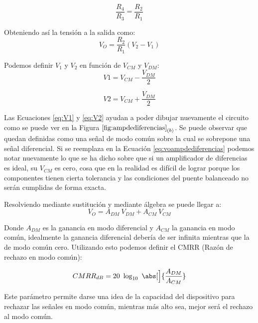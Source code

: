\begin{equation}
\label{eq:puentebalanceado}
	\dfrac{R_4}{R_3} = \dfrac{R_2}{R_1}
\end{equation}
	
	Obteniendo así la tensión a la salida como:
\begin{equation}
\label{eq:voampdediferencias}
V_O= \dfrac{R_2}{R_1} (V_2 - V_1)
\end{equation}	

	Podemos definir $V_1$ y $V_2$ en función de $V_{CM}$ y $V_{DM}$:
\begin{equation}
\label{eq:V1}
V1=V_{CM} - \dfrac{V_{DM}}{2}
\end{equation}

\begin{equation}
\label{eq:V2}
V2=V_{CM} + \dfrac{V_{DM}}{2}
\end{equation}
	
	Las Ecuaciones \ref{eq:V1} y \ref{eq:V2} ayudan a poder dibujar nuevamente el circuito como se puede ver en la Figura $\ref{fig:ampdediferencias}_{(b)}$.
Se puede observar que quedan definidas como una señal de modo común sobre la cual se sobrepone una señal diferencial. Si se reemplaza en la Ecuación \ref{eq:voampdediferencias} podemos notar nuevamente lo que se ha dicho sobre que si un amplificador de diferencias es ideal, su $V_{CM}$ es cero, cosa que en la realidad es difícil de lograr porque los componentes tienen cierta tolerancia y las condiciones del puente balanceado no serán cumplidas de forma exacta. 

	Resolviendo mediante sustitución y mediante álgebra se puede llegar a:
\begin{equation}
\label{eq:voconganancias}
V_O=A_{DM} \ V_{DM} + A_{CM} \ V_{CM}
\end{equation}

	Donde $A_{DM}$ es la ganancia en modo diferencial y $A_{CM}$ la ganancia en modo común, idealmente la ganancia diferencial debería de ser infinita mientras que la de modo común cero. Utilizando esto podemos definir el CMRR (Razón de rechazo en modo común):
	
\begin{equation}
\label{eq:CMRR}
	CMRR_{dB} = 20 \ \log_{10} \ \abs[\Big]{\dfrac{A_{DM}}{A_{CM}}}
\end{equation}

	Este parámetro permite darse una idea de la capacidad del dispositivo para rechazar las señales en modo común, mientras más alto sea, mejor será el rechazo al modo común.
	
